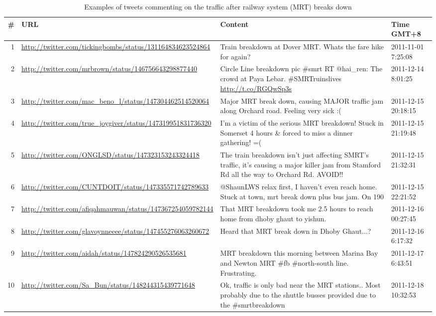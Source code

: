 \documentclass[draft]{sig-alternate}
\begin{document}
\begin{table}[htb]
	\centering
	\caption{Examples of tweets commenting on the traffic after railway system (MRT) breaks down}
	\label{tbl:tweets}
	\begin{tabular}{|r|p{5.5cm}|p{8.1cm}|p{2.1cm}|}
		\hline
		\# & URL & Content & Time GMT+8 \\
		\hline
		1 & \url{http://twitter.com/tickingbombs/status/131164834623524864} & Train breakdown at Dover MRT. Whats the fare hike for again? & 2011-11-01 7:25:08  \\
		\hline
		2 & \url{http://twitter.com/mrbrown/status/146756643298877440} & Circle Line breakdown pic \#smrt RT @hai\_ren: The crowd at Paya Lebar. \#SMRTruinslives \url{http://t.co/RGQwSp3s} & 2011-12-14 8:01:25 \\
		\hline
		3 & \url{http://twitter.com/mac_beno_l/status/147304462514520064} & Major MRT break down, causing MAJOR traffic jam along Orchard road. Feeling very sick :( & 2011-12-15 20:18:15 \\
		\hline
		4 & \url{http://twitter.com/true_joygiver/status/147319951831736320} & I'm a victim of the serious MRT breakdown! Stuck in Somerset 4 hours \& forced to miss a dinner gathering! =( & 2011-12-15 21:19:48 \\
		\hline
		5 & \url{http://twitter.com/ONGLSD/status/147323153243324418} & The train breakdown isn't just affecting SMRT's traffic, it's causing a major killer jam from Stamford Rd all the way to Orchard Rd. AVOID!! & 2011-12-15 21:32:31 \\
		\hline
		6 & \url{http://twitter.com/CUNTDOIT/status/147335571742789633} & @ShaunLWS relax first, I haven't even reach home. Stuck at town, mrt break down plus bus jam. On 190 & 2011-12-15 22:21:52 \\
		\hline
		7 & \url{http://twitter.com/afiqahmauwan/status/147367254059782144}	& That MRT breakdown took me 2.5 hours to reach home from dhoby ghaut to yishun. & 2011-12-16 00:27:45 \\
		\hline
		8 & \url{http://twitter.com/glavoynneeee/status/147455276063260672} & Heard that MRT break down in Dhoby Ghaut...? & 2011-12-16 6:17:32 \\
		\hline
		9 & \url{http://twitter.com/aidah/status/147824290526535681} & MRT breakdown this morning between Marina Bay and Newton MRT \#fb \#north-south line. Frustrating. & 2011-12-17 6:43:51 \\
		\hline
		10 & \url{http://twitter.com/Sa_Bun/status/148244315439771648} & Ok, traffic is only bad near the MRT stations.. Most probably due to the shuttle busses provided due to the \#smrtbreakdown & 2011-12-18 10:32:53 \\
		\hline
	\end{tabular}
\end{table}
\end{document}
